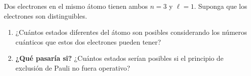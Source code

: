\item Dos electrones en el mismo átomo tienen ambos $n = 3$ y $\ell = 1$. Suponga que los electrones son distinguibles.
\begin{enumerate}
    \item ¿Cuántos estados diferentes del átomo son posibles considerando los números cuánticos que estos dos electrones pueden tener?
    \item \textbf{¿Qué pasaría si?} ¿Cuántos estados serían posibles si el principio de exclusión de Pauli no fuera operativo?
\end{enumerate}